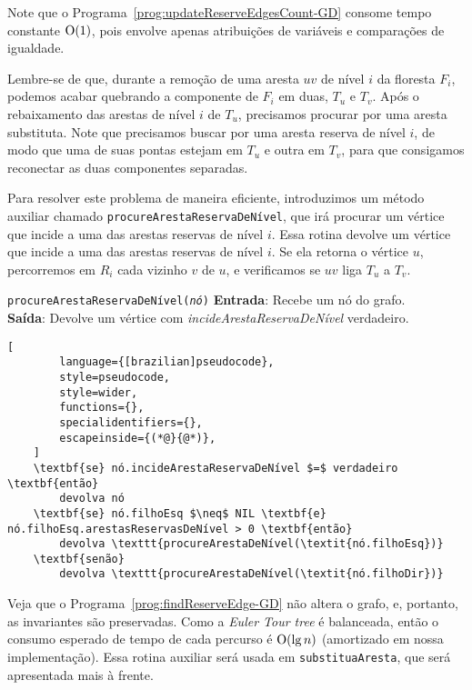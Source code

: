 Note que o Programa~\ref{prog:updateReserveEdgesCount-GD} consome tempo constante $\mathrm{O}(1)$, pois envolve apenas atribuições de variáveis e comparações de igualdade.


Lembre-se de que, durante a remoção de uma aresta $uv$ de nível $i$ da floresta $F_i$, podemos acabar quebrando a componente de $F_i$ em duas, $T_u$ e $T_v$. Após o rebaixamento das arestas de nível $i$ de $T_u$, precisamos procurar por uma aresta substituta. Note que precisamos buscar por uma aresta reserva de nível $i$, de modo que uma de suas pontas estejam em $T_u$ e outra em $T_v$, para que consigamos reconectar as duas componentes separadas. 

Para resolver este problema de maneira eficiente, introduzimos um método auxiliar chamado \texttt{procureArestaReservaDeNível}, que irá procurar um vértice que incide a uma das arestas reservas de nível $i$.
Essa rotina devolve um vértice que incide a uma das arestas reservas de nível $i$. Se ela retorna o vértice $u$, percorremos em $R_i$ cada vizinho $v$ de $u$, e verificamos se $uv$ liga $T_u$ a $T_v$. 

\begin{programruledcaption}{\texttt{procureArestaReservaDeNível(\textit{nó})} \label{prog:findReserveEdge-GD}}
    \noindent\textbf{Entrada}: Recebe um nó do grafo.
    \\
    \noindent\textbf{Saída}: Devolve um vértice com \textit{incideArestaReservaDeNível} verdadeiro.
    \vspace{-0.5\baselineskip}
    \begin{lstlisting}[
        language={[brazilian]pseudocode},
        style=pseudocode,
        style=wider,
        functions={},
        specialidentifiers={},
        escapeinside={(*@}{@*)},
    ]
    \textbf{se} nó.incideArestaReservaDeNível $=$ verdadeiro \textbf{então}
        devolva nó
    \textbf{se} nó.filhoEsq $\neq$ NIL \textbf{e} nó.filhoEsq.arestasReservasDeNível > 0 \textbf{então}
        devolva \texttt{procureArestaDeNível(\textit{nó.filhoEsq})}
    \textbf{senão}
        devolva \texttt{procureArestaDeNível(\textit{nó.filhoDir})}
\end{lstlisting}
\vspace{-0.5\baselineskip}
\end{programruledcaption}

Veja que o Programa~\ref{prog:findReserveEdge-GD} não altera o grafo, e, portanto, as invariantes são preservadas. Como a \textit{Euler Tour tree} é balanceada, então o consumo esperado de tempo de cada percurso é $\mathrm{O}(\lg n)$ (amortizado em nossa implementação). Essa rotina auxiliar será usada em \texttt{substituaAresta}, que será apresentada mais à frente.

